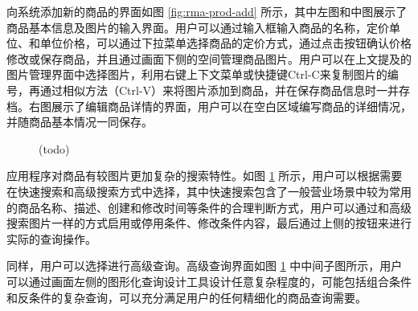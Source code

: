 向系统添加新的商品的界面如图 \ref{fig:rma-prod-add} 所示，其中左图和中图展示了商品基本信息及图片的输入界面。用户可以通过输入框输入商品的名称，定价单位、和单位价格，可以通过下拉菜单选择商品的定价方式，通过点击按钮确认价格修改或保存商品，并且通过画面下侧的空间管理商品图片。用户可以在上文提及的图片管理界面中选择图片，利用右键上下文菜单或快捷键Ctrl-C来复制图片的编号，再通过相似方法（Ctrl-V）来将图片添加到商品，并在保存商品信息时一并存档。右图展示了编辑商品详情的界面，用户可以在空白区域编写商品的详细情况，并随商品基本情况一同保存。

\begin{figure}[htbp]
    \hfill
    \hfill
	\caption{(todo)}
	\label{fig:rma-prod-as}
\end{figure}

应用程序对商品有较图片更加复杂的搜索特性。如图 \ref{fig:rma-prod-as} 所示，用户可以根据需要在快速搜索和高级搜索方式中选择，其中快速搜索包含了一般营业场景中较为常用的商品名称、描述、创建和修改时间等条件的合理判断方式，用户可以通过和高级搜索图片一样的方式启用或停用条件、修改条件内容，最后通过上侧的按钮来进行实际的查询操作。

同样，用户可以选择进行高级查询。高级查询界面如图 \ref{fig:rma-prod-as} 中中间子图所示，用户可以通过画面左侧的图形化查询设计工具设计任意复杂程度的，可能包括组合条件和反条件的复杂查询，可以充分满足用户的任何精细化的商品查询需要。

